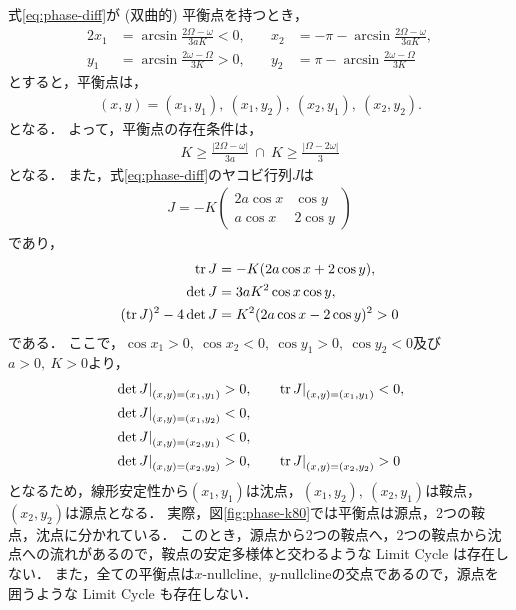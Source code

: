 \documentclass[../main]{subfiles}
\begin{document}
    式\eqref{eq:phase-diff}が (双曲的) 平衡点を持つとき，
    \begin{alignat*}{2}
        x_1&=\arcsin \frac{2\Omega-\omega}{3aK}<0,&\quad x_2&=-\pi-\arcsin \frac{2\Omega-\omega}{3aK},\\
        y_1&=\arcsin \frac{2\omega-\Omega}{3K}>0,&\quad y_2&=\pi-\arcsin \frac{2\omega-\Omega}{3K}
    \end{alignat*}
    とすると，平衡点は，
    \begin{align*}
        (x,y)=(x_1,y_1),\ (x_1,y_2),\ (x_2,y_1),\ (x_2,y_2).
    \end{align*}
    となる．
    よって，平衡点の存在条件は，
    \begin{align*}
        K\geq \frac{|2\Omega-\omega|}{3a}\ \cap \ K\geq \frac{|\Omega-2\omega|}{3}
    \end{align*}
    となる．
    また，式\eqref{eq:phase-diff}のヤコビ行列$J$は
    \begin{align*}
        J=-K\begin{pmatrix}
            2a\cos x&\cos y\\
            a\cos x&2\cos y
        \end{pmatrix}
    \end{align*}
    であり，
    \begin{align*}
        \tr J&=-K(2a\cos x+2\cos y),\\
        \det J&=3aK^2\cos x\cos y,\\
        (\tr J)^2-4\det J&=K^2(2a\cos x-2\cos y)^2> 0
    \end{align*}
    である．
    ここで，$\cos x_1>0,\ \cos x_2<0,\ \cos y_1>0,\ \cos y_2<0$及び$a>0,\ K>0$より，
    \begin{alignat*}{2}
        \left.\det J \right|_{(x,y)=(x_1,y_1)}&>0, &\quad  \left.\tr J \right|_{(x,y)=(x_1,y_1)}&<0,\\
        \left.\det J \right|_{(x,y)=(x_1,y_2)}&<0, & &\\
        \left.\det J \right|_{(x,y)=(x_2,y_1)}&<0, & &\\
        \left.\det J \right|_{(x,y)=(x_2,y_2)}&>0, &\quad  \left.\tr J \right|_{(x,y)=(x_2,y_2)}&>0
    \end{alignat*}
    となるため，線形安定性から$(x_1,y_1)$は沈点，$(x_1,y_2),\ (x_2,y_1)$は鞍点，$(x_2,y_2)$は源点となる．
    実際，図\ref{fig:phase-k80}では平衡点は源点，2つの鞍点，沈点に分かれている．
    このとき，源点から2つの鞍点へ，2つの鞍点から沈点への流れがあるので，鞍点の安定多様体と交わるような Limit Cycle は存在しない．
    また，全ての平衡点は$x$-nullcline,\ $y$-nullclineの交点であるので，源点を囲うような Limit Cycle も存在しない．
\end{document}
